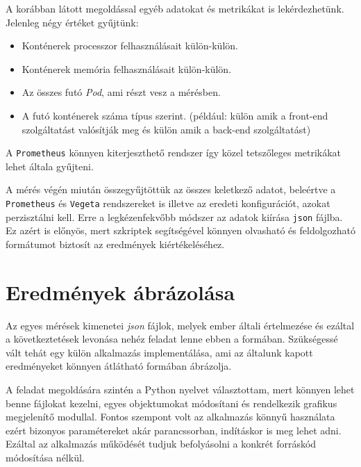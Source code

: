 

A korábban látott megoldással egyéb adatokat és metrikákat is lekérdezhetünk. 
Jelenleg négy értéket gyűjtünk:
\begin{itemize}
  \item Konténerek processzor felhasználásait külön-külön.
  \item Konténerek memória felhasználásait külön-külön.
  \item Az összes futó \textit{Pod}, ami részt vesz a mérésben.
  \item A futó konténerek száma típus szerint. (például: külön amik a front-end szolgáltatást valósítják meg és külön amik a back-end szolgáltatást)
\end{itemize}

A \verb+Prometheus+ könnyen kiterjeszthető rendszer így közel tetszőleges metrikákat lehet általa gyűjteni. 


A mérés végén miután összegyűjtöttük az összes keletkező adatot, beleértve a \verb+Prometheus+ és \verb+Vegeta+ rendszereket is illetve az eredeti konfigurációt, azokat perzisztálni kell.
Erre a legkézenfekvőbb módszer az adatok kiírása \verb+json+ fájlba.
Ez azért is előnyös, mert szkriptek segítségével könnyen olvasható és feldolgozható formátumot biztosít az eredmények kiértékeléséhez. 

\section{Eredmények ábrázolása}
Az egyes mérések kimenetei \textit{json} fájlok, melyek ember általi értelmezése és ezáltal a következtetések levonása nehéz feladat lenne ebben a formában. 
Szükségessé vált tehát egy külön alkalmazás implementálása, ami az általunk kapott eredményeket könnyen átlátható formában ábrázolja. 

A feladat megoldására szintén a Python nyelvet választottam, mert könnyen lehet benne fájlokat kezelni, egyes objektumokat módosítani és rendelkezik grafikus megjelenítő modullal.
Fontos szempont volt az alkalmazás könnyű használata ezért bizonyos paramétereket akár parancssorban, indításkor is meg lehet adni. 
Ezáltal az alkalmazás működését tudjuk befolyásolni a konkrét forráskód módosítása nélkül.

